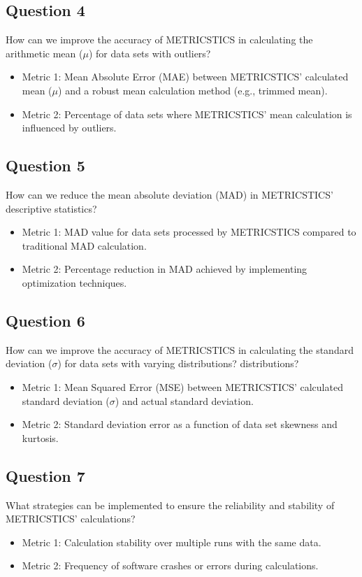 \subsection*{Question 4}
How can we improve the accuracy of METRICSTICS in calculating the arithmetic mean ($\mu$) for data sets with outliers?
\begin{itemize}
    \item Metric 1: Mean Absolute Error (MAE) between METRICSTICS' calculated mean ($\mu$) and a robust mean calculation method (e.g., trimmed mean).
    \item Metric 2: Percentage of data sets where METRICSTICS' mean calculation is influenced by outliers.
\end{itemize}

\subsection*{Question 5}
How can we reduce the mean absolute deviation (MAD) in METRICSTICS' descriptive statistics?
\begin{itemize}
    \item Metric 1: MAD value for data sets processed by METRICSTICS compared to traditional MAD calculation.
    \item Metric 2: Percentage reduction in MAD achieved by implementing optimization techniques.
\end{itemize}

\subsection*{Question 6}
How can we improve the accuracy of METRICSTICS in calculating the standard deviation ($\sigma$) for data sets with varying distributions? distributions?
\begin{itemize}
    \item Metric 1: Mean Squared Error (MSE) between METRICSTICS' calculated standard deviation ($\sigma$) and actual standard deviation.
    \item Metric 2: Standard deviation error as a function of data set skewness and kurtosis.
\end{itemize}

\subsection*{Question 7}
What strategies can be implemented to ensure the reliability and stability of METRICSTICS' calculations?
\begin{itemize}
    \item Metric 1: Calculation stability over multiple runs with the same data.
    \item Metric 2: Frequency of software crashes or errors during calculations.
\end{itemize}

